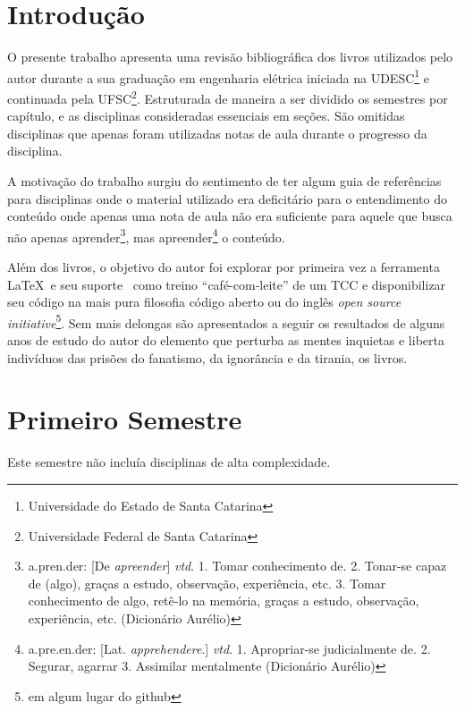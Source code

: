 \documentclass[
	12pt,				%
	openright,			%
	oneside,			%
	a4paper,			%
	english,			%
	french,				%
	spanish,			%
	brazil				%
	]{abntex2}
\begin{document}
\chapter*[Introdução]{Introdução} %
O presente trabalho apresenta uma revisão bibliográfica dos livros utilizados pelo autor durante a sua graduação em engenharia elétrica iniciada na UDESC\footnote{Universidade do Estado de Santa Catarina} e continuada pela UFSC\footnote{Universidade Federal de Santa Catarina}. Estruturada de maneira a ser dividido os semestres por capítulo, e as disciplinas consideradas essenciais em seções. São omitidas disciplinas que apenas foram utilizadas notas de aula durante o progresso da disciplina.\par
A motivação do trabalho surgiu do sentimento de ter algum guia de referências para disciplinas onde o material utilizado era deficitário para o entendimento do conteúdo onde apenas uma nota de aula não era suficiente para aquele que busca não apenas aprender\footnote{a.pren.der: [De \textit{apreender}] \textit{vtd}. 1. Tomar conhecimento de. 2. Tonar-se capaz de (algo), graças a estudo, observação, experiência, etc. 3. Tomar conhecimento de algo, retê-lo na memória, graças a
estudo, observação, experiência, etc. (Dicionário Aurélio)}, mas apreender\footnote{a.pre.en.der: [Lat. \textit{apprehendere}.] \textit{vtd}. 1. Apropriar-se judicialmente de. 2. Segurar, agarrar 3. Assimilar mentalmente (Dicionário Aurélio)} o conteúdo.\par
Além dos livros, o objetivo do autor foi explorar por primeira vez a ferramenta \LaTeX\ e seu suporte \abnTeX\ como treino “café-com-leite” de um TCC e disponibilizar seu código na mais pura filosofia código aberto ou do inglês \textit{open source initiative}\footnote{em algum lugar do github}.
Sem mais delongas são apresentados a seguir os resultados de alguns anos de estudo do autor do elemento que perturba as mentes inquietas e liberta indivíduos das prisões do fanatismo, da ignorância e da tirania, os livros.

\chapter{Primeiro Semestre}\label{cap:1sem}
Este semestre não incluía disciplinas de alta complexidade.
\end{document}
